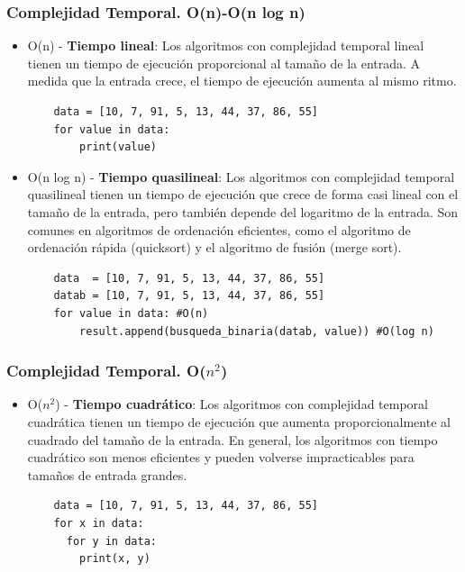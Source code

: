 \documentclass[xcolor=table]{beamer}
\begin{document}
\begin{frame} [fragile] \frametitle{Complejidad Temporal. O(n)-O(n log n) }\footnotesize  
    
 \begin{itemize}   

   
       
    \item O(n) - \textbf{Tiempo lineal}: Los algoritmos con complejidad temporal lineal tienen un tiempo de ejecución proporcional al tamaño de la entrada. A medida que la entrada crece, el tiempo de ejecución aumenta al mismo ritmo. 

    \begin{verbatim}
    data = [10, 7, 91, 5, 13, 44, 37, 86, 55]
    for value in data:
        print(value)
    \end{verbatim}

     \item O(n log n) -\textbf{ Tiempo quasilineal}: Los algoritmos con complejidad temporal quasilineal tienen un tiempo de ejecución que crece de forma casi lineal con el tamaño de la entrada, pero también depende del logaritmo de la entrada.  Son comunes en algoritmos de ordenación eficientes, como el algoritmo de ordenación rápida (quicksort) y el algoritmo de fusión (merge sort).

    \begin{verbatim}
    data  = [10, 7, 91, 5, 13, 44, 37, 86, 55]
    datab = [10, 7, 91, 5, 13, 44, 37, 86, 55]
    for value in data: #O(n)
        result.append(busqueda_binaria(datab, value)) #O(log n)
    \end{verbatim}
   
    
\end{itemize}

\end{frame} 

\begin{frame} [fragile] \frametitle{Complejidad Temporal. O($n^2$)} \footnotesize

\begin{itemize}
      \item O($n^2$) - \textbf{Tiempo cuadrático}: Los algoritmos con complejidad temporal cuadrática tienen un tiempo de ejecución que aumenta proporcionalmente al cuadrado del tamaño de la entrada. En general, los algoritmos con tiempo cuadrático son menos eficientes y pueden volverse impracticables para tamaños de entrada grandes.
    
    \begin{verbatim}
    data = [10, 7, 91, 5, 13, 44, 37, 86, 55]
    for x in data:
      for y in data:
        print(x, y)
    \end{verbatim}


        
    
    
\end{itemize}
\end{frame} 
\end{document}
